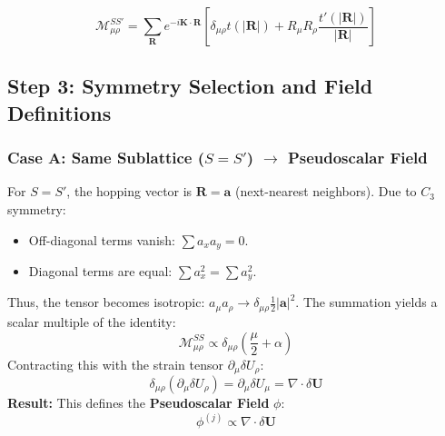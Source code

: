 \documentclass[10pt, oneside]{article}
\begin{document}
\begin{equation}
\mathcal{M}_{\mu\rho}^{SS'} = \sum_{\boldsymbol{R}} e^{-i\boldsymbol{K} \cdot \boldsymbol{R}} \left[ \delta_{\mu\rho} t(|\boldsymbol{R}|) + R_\mu R_\rho \frac{t'(|\boldsymbol{R}|)}{|\boldsymbol{R}|} \right]
\end{equation}

\subsection{Step 3: Symmetry Selection and Field Definitions}

\subsubsection{Case A: Same Sublattice ($S=S'$) $\rightarrow$ Pseudoscalar Field}
For $S=S'$, the hopping vector is $\boldsymbol{R} = \boldsymbol{a}$ (next-nearest neighbors). Due to $C_3$ symmetry:
\begin{itemize}
    \item Off-diagonal terms vanish: $\sum a_x a_y = 0$.
    \item Diagonal terms are equal: $\sum a_x^2 = \sum a_y^2$.
\end{itemize}
Thus, the tensor becomes isotropic: $a_\mu a_\rho \to \delta_{\mu\rho} \frac{1}{2} |\boldsymbol{a}|^2$. The summation yields a scalar multiple of the identity:
\begin{equation}
\mathcal{M}_{\mu\rho}^{SS} \propto \delta_{\mu\rho} \left( \frac{\mu}{2} + \alpha \right)
\end{equation}
Contracting this with the strain tensor $\partial_\mu \delta U_\rho$:
\begin{equation}
\delta_{\mu\rho} (\partial_\mu \delta U_\rho) = \partial_\mu \delta U_\mu = \nabla \cdot \delta \boldsymbol{U}
\end{equation}
\textbf{Result:} This defines the \textbf{Pseudoscalar Field} $\phi$:
\begin{equation}
\phi^{(j)} \propto \nabla \cdot \delta \boldsymbol{U}
\end{equation}
\end{document}
